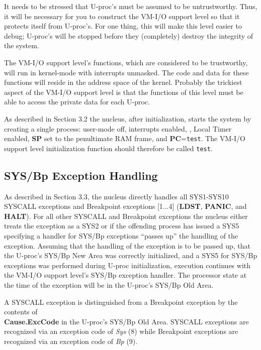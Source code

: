 It needs to be stressed that U-proc's must be assumed to be untrustworthy.
Thus, it will be necessary for you to construct the VM-I/O support level so that it protects itself from U-proc's. For one thing, this will make this level easier to debug; U-proc's will be stopped before they (completely) destroy the integrity of the system.

The VM-I/O support level's functions, which are considered to be trustworthy, will run in kernel-mode with interrupts unmasked. 
The code and data for these functions will reside in the address space of the kernel. 
Probably the trickiest aspect of the VM-I/O support level is that the functions of this level must be able to access the private data for each U-proc.

As described in Section 3.2 the nucleus, after initialization, starts the system by creating a single process: user-mode off, interrupts enabled, \vmoff{}, Local Timer enabled, \textbf{SP} set to the penultimate RAM frame, and \textbf{PC}=\verb+test+. 
The VM-I/O support level initialization function should therefore be called \verb+test+.



\subsection{SYS/Bp Exception Handling}\label{sec:syscall}
As described in Section 3.3, the nucleus directly handles all SYS1-SYS10 SYSCALL exceptions and Breakpoint exceptions [1...4] (\textbf{LDST}, \textbf{PANIC}, and \textbf{HALT}).
For all other SYSCALL and Breakpoint exceptions the nucleus either treats the exception as a SYS2 or if the offending process has issued a SYS5 specifying a handler for SYS/Bp exceptions ``passes up'' the handling of the exception.
Assuming that the handling of the exception is to be passed up, that the U-proc's SYS/Bp New Area was correctly initialized, and a SYS5 for SYS/Bp exceptions was performed during U-proc initialization, execution continues with the VM-I/O support level's SYS/Bp exception handler. 
The processor state at the time of the exception will be in the U-proc's SYS/Bp Old Area.

A SYSCALL exception is distinguished from a Breakpoint exception by the contents of \\ \textbf{Cause.ExcCode} in the U-proc's SYS/Bp Old Area. 
SYSCALL exceptions are recognized via an exception code of \emph{Sys} (8) while Breakpoint exceptions are recognized via an exception code of \emph{Bp} (9).

